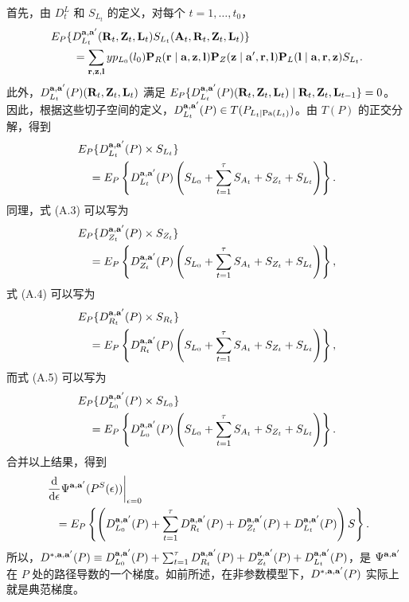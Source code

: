 首先，由 $D_t^L$ 和 $S_{L_t}$ 的定义，对每个 $t=1,\ldots,t_0$，
\[
\begin{aligned}
&E_P\{D_{L_t}^{\mathbf a,\mathbf a'}(\mathbf R_t,\mathbf Z_t,\mathbf L_t)
 S_{L_t}(\mathbf A_t,\mathbf R_t,\mathbf Z_t,\mathbf L_t)\}\\
&\qquad=\sum_{\mathbf r,\mathbf z,\mathbf l}yp_{L_0}(l_0)\mathbf P_R(\mathbf r\mid\mathbf a,\mathbf z,\mathbf l)\mathbf P_Z(\mathbf z\mid\mathbf a',\mathbf r,\mathbf l)\mathbf P_L(\mathbf l\mid\mathbf a,\mathbf r,\mathbf z) S_{L_t}.
\end{aligned}
\]
此外，$D_{L_t}^{\mathbf a,\mathbf a'}(P)(\mathbf R_t,\mathbf Z_t,\mathbf L_t)$ 满足
$E_P\{D_{L_t}^{\mathbf a,\mathbf a'}(P)(\mathbf R_t,\mathbf Z_t,\mathbf L_t)\mid\mathbf R_t,\mathbf Z_t,\mathbf L_{t-1}\}=0$。
因此，根据这些切子空间的定义，$D_{L_t}^{\mathbf a,\mathbf a'}(P)\in T(P_{L_t\mid\mathrm{Pa}(L_t)})$。由 $T(P)$ 的正交分解，得到
\[
\begin{aligned}
&E_P\{D_{L_t}^{\mathbf a,\mathbf a'}(P)\times S_{L_t}\}\\
&\quad=E_P\left\{D_{L_t}^{\mathbf a,\mathbf a'}(P)
 \left(S_{L_0}+\sum_{t=1}^\tau S_{A_t}+S_{Z_t}+S_{L_t}\right)\right\}.
\end{aligned}
\]
同理，式 (A.3) 可以写为
\[
\begin{aligned}
&E_P\{D_{Z_t}^{\mathbf a,\mathbf a'}(P)\times S_{Z_t}\}\\
&\quad=E_P\left\{D_{Z_t}^{\mathbf a,\mathbf a'}(P)
 \left(S_{L_0}+\sum_{t=1}^\tau S_{A_t}+S_{Z_t}+S_{L_t}\right)\right\},
\end{aligned}
\]
式 (A.4) 可以写为
\[
\begin{aligned}
&E_P\{D_{R_t}^{\mathbf a,\mathbf a'}(P)\times S_{R_t}\}\\
&\quad=E_P\left\{D_{R_t}^{\mathbf a,\mathbf a'}(P)
 \left(S_{L_0}+\sum_{t=1}^\tau S_{A_t}+S_{Z_t}+S_{L_t}\right)\right\},
\end{aligned}
\]
而式 (A.5) 可以写为
\[
\begin{aligned}
&E_P\{D_{L_0}^{\mathbf a,\mathbf a'}(P)\times S_{L_0}\}\\
&\quad=E_P\left\{D_{L_0}^{\mathbf a,\mathbf a'}(P)
 \left(S_{L_0}+\sum_{t=1}^\tau S_{A_t}+S_{Z_t}+S_{L_t}\right)\right\}.
\end{aligned}
\]
合并以上结果，得到
\[
\begin{aligned}
&\left.\frac{\mathrm d}{\mathrm d\epsilon}\Psi^{\mathbf a,\mathbf a'}(P^S(\epsilon))\right|_{\epsilon=0}\\
&\quad=E_P\left\{\left(D_{L_0}^{\mathbf a,\mathbf a'}(P)
 +\sum_{t=1}^\tau D_{R_t}^{\mathbf a,\mathbf a'}(P)
 +D_{Z_t}^{\mathbf a,\mathbf a'}(P)+D_{L_t}^{\mathbf a,\mathbf a'}(P)\right)S\right\}.
\end{aligned}
\]
所以，$D^{*,\mathbf a,\mathbf a'}(P)\equiv D_{L_0}^{\mathbf a,\mathbf a'}(P)+\sum_{t=1}^\tau D_{R_t}^{\mathbf a,\mathbf a'}(P)+D_{Z_t}^{\mathbf a,\mathbf a'}(P)+D_{L_t}^{\mathbf a,\mathbf a'}(P)$，是 $\Psi^{\mathbf a,\mathbf a'}$ 在 $P$ 处的路径导数的一个梯度。如前所述，在非参数模型下，$D^{*,\mathbf a,\mathbf a'}(P)$ 实际上就是典范梯度。

